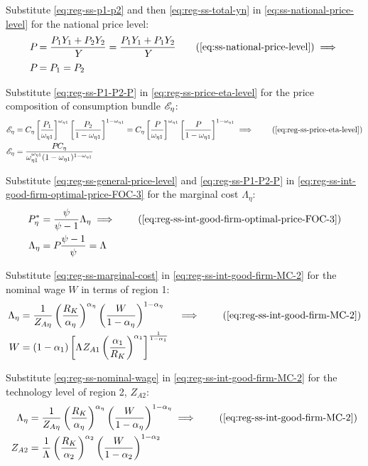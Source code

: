 \documentclass[
thesis.tex
]{subfiles}
\begin{document}
Substitute \ref{eq:reg-ss-p1-p2} and then \ref{eq:reg-ss-total-yn} in \ref{eq:ss-national-price-level} for the national price level:
	\begin{align}
		P_{} &= \frac{P_{1} Y_{1} + P_{2} Y_{2}}{Y_{}} = \frac{P_{1} Y_{1} + P_{1} Y_{2}}{Y_{}} \tag{\ref{eq:ss-national-price-level}} \implies \nonumber \\
		P_{} &= P_{1} = P_{2} \label{eq:reg-ss-P1-P2-P}
	\end{align}

Substitute \ref{eq:reg-ss-P1-P2-P} in \ref{eq:reg-ss-price-eta-level} for the price composition of consumption bundle $\te[]$:
\begin{align}
	\te[] &= C_{\eta} \left[ \frac{P_{1}}{\omega_{\eta 1}} \right]^{\omega_{\eta 1}} \left[ \frac{P_{2}}{1 -\omega_{\eta 1}} \right]^{1 -\omega_{\eta 1}} = C_{\eta} \left[ \frac{P_{}}{\omega_{\eta 1}} \right]^{\omega_{\eta 1}} \left[ \frac{P_{}}{1 -\omega_{\eta 1}} \right]^{1 -\omega_{\eta 1}} \implies \tag{\ref{eq:reg-ss-price-eta-level}} \\
	\te[] &= \frac{P_{} C_{\eta}}{\omega_{\eta 1}^{\omega_{\eta 1}} (1 -\omega_{\eta 1})^{1 -\omega_{\eta 1}}} \label{eq:reg-ss-te}
\end{align}

Substitute \ref{eq:reg-ss-general-price-level} and \ref{eq:reg-ss-P1-P2-P} in \ref{eq:reg-ss-int-good-firm-optimal-price-FOC-3} for the marginal cost $\Lambda_{\eta}$:
\begin{align}
	P_{\eta}^{\ast} &= \frac{\psi}{\psi-1} \Lambda_{\eta} \implies \tag{\ref{eq:reg-ss-int-good-firm-optimal-price-FOC-3}} \\
	\Lambda_{\eta} &= P_{} \frac{\psi-1}{\psi} = \Lambda_{} \label{eq:reg-ss-marginal-cost}
\end{align}

Substitute \ref{eq:reg-ss-marginal-cost} in \ref{eq:reg-ss-int-good-firm-MC-2} for the nominal wage $W$ in terms of region 1:
\begin{alignat}{2}
	\Lambda_{\eta} &= \frac{1}{Z_{A\eta}} \left( \frac{R_K}{{\alpha_{\eta}}} \right)^{{\alpha_{\eta}}} \left( \frac{W}{1-{\alpha_{\eta}}} \right)^{1-{\alpha_{\eta}}} &\implies \tag{\ref{eq:reg-ss-int-good-firm-MC-2}} \\ 
	W &= (1-{\alpha_{1}}) \left[ \Lambda_{} Z_{A1} \left( \frac{{\alpha_{1}}}{R_K} \right)^{{\alpha_{1}}} \right]^\frac{1}{1-{\alpha_{1}}} & \label{eq:reg-ss-nominal-wage}
\end{alignat}

Substitute \ref{eq:reg-ss-nominal-wage} in \ref{eq:reg-ss-int-good-firm-MC-2} for the technology level of region 2, $Z_{A2}$:
\begin{align}
	\Lambda_{\eta} &= \frac{1}{Z_{A\eta}} \left( \frac{R_K}{{\alpha_{\eta}}} \right)^{{\alpha_{\eta}}} \left( \frac{W}{1-{\alpha_{\eta}}} \right)^{1-{\alpha_{\eta}}} \implies \tag{\ref{eq:reg-ss-int-good-firm-MC-2}} \\
	Z_{A2} &= \frac{1}{\Lambda_{}} \left( \frac{R_K}{{\alpha_{2}}} \right)^{{\alpha_{2}}} \left( \frac{W}{1-{\alpha_{2}}} \right)^{1-{\alpha_{2}}} \label{eq:reg-ss-za2}
\end{align}
\end{document}
